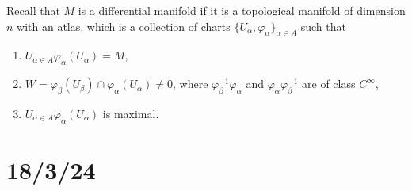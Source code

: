 \documentclass[12pt]{book}
\begin{document}
\begin{Rmk}\label{Rmk: Differentiable manifold}
    Recall that $M$ is a differential manifold if it is a topological manifold of dimension $n$ with an atlas, which is a collection of charts $\{U_\alpha,\varphi_\alpha\}_{\alpha\in A}$ such that
    \begin{enumerate}[label=\RmkLbl]
    
        \item $U_{\alpha\in A} \varphi_\alpha(U_\alpha) = M$,

        \item $W = \varphi_\beta(U_\beta)\cap\varphi_\alpha(U_\alpha)\neq 0$, where $\varphi_\beta^{-1}\varphi_\alpha$ and $\varphi_\alpha\varphi_\beta^{-1}$ are of class $C^\infty$, 

        \item $U_{\alpha\in A} \varphi_\alpha(U_\alpha)$ is maximal.
    \end{enumerate}
\end{Rmk}

\begin{Exp}\label{Exp: Differentiable manifolds}
\end{Exp}

\section*{18/3/24}\label{Sec: 18/3/24}
\end{document}
